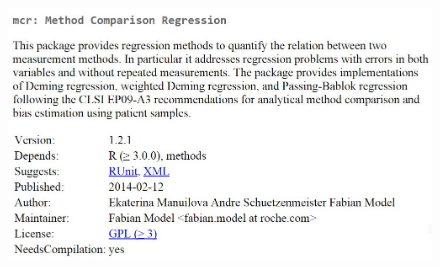 \documentclass[compress]{beamer}        %
\begin{document}
\begin{frame}
\begin{figure}
\centering
\includegraphics[width=1.05\linewidth]{images/CRAN-mcr}

\end{figure}
\end{frame}
\end{document}
